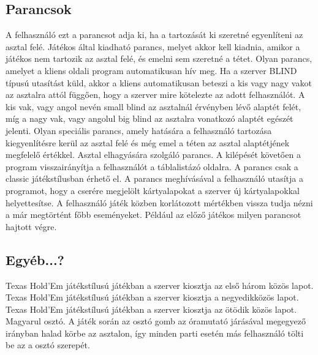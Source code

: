 \subsection{Parancsok}
A felhasználó ezt a parancsot adja ki, ha a tartozását ki szeretné egyenlíteni az asztal felé.
Játékos által kiadható parancs, melyet akkor kell kiadnia, amikor a játékos nem tartozik az asztal felé, és emelni sem szeretné a tétet.
Olyan parancs, amelyet a kliens oldali program automatikusan hív meg. Ha a szerver BLIND típusú utasítást küld, akkor a kliens automatikusan beteszi a kis vagy nagy vakot az asztalra attól függően, hogy a szerver mire kötelezte az adott felhasználót. A kis vak, vagy angol nevén small blind az asztalnál érvényben lévő alaptét felét, míg a nagy vak, vagy angolul big blind az asztalra vonatkozó alaptét egészét jelenti.
Olyan speciális parancs, amely hatására a felhasználó tartozása kiegyenlítésre kerül az asztal felé és még emel a téten az asztal alaptétjének megfelelő értékkel.
Asztal elhagyására szolgáló parancs. A kilépését követően a program visszairányítja a felhasználót a táblalistázó oldalra.
A parancs csak a classic játékstílusban érhető el. A parancs meghívásával a felhasználó utasítja a programot, hogy a cserére megjelölt kártyalapokat a szerver új kártyalapokkal helyettesítse.
A felhasználó játék közben korlátozott mértékben vissza tudja nézni a már megtörtént főbb eseményeket. Például az előző játékos milyen parancsot hajtott végre.
\subsection{Egyéb...?}
Texas Hold'Em játékstílusú játékban a szerver kiosztja az első három közös lapot.
Texas Hold'Em játékstílusú játékban a szerver kiosztja a negyedikközös lapot.
Texas Hold'Em játékstílusú játékban a szerver kiosztja az ötödik közös lapot.
Magyarul osztó. A játék során az osztó gomb az óramutató járásával megegyező irányban halad körbe az asztalon, így minden parti esetén más felhasználó tölti be az a osztó szerepét.

